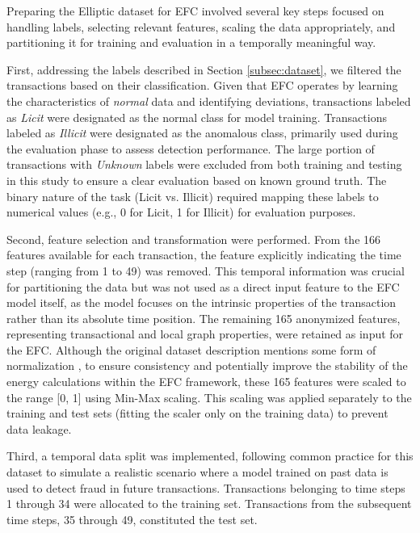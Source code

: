\documentclass[12pt]{article}
\begin{document}
Preparing the Elliptic dataset for EFC involved several key steps focused on handling labels, selecting relevant features,
scaling the data appropriately, and partitioning it for training and evaluation in a temporally meaningful way.

First, addressing the labels described in Section \ref{subsec:dataset}, we filtered the transactions based on their
classification. Given that EFC operates by learning the characteristics of \textit{normal} data and identifying deviations,
transactions labeled as \textit{Licit} were designated as the normal class for model training. Transactions labeled as \textit{Illicit}
were designated as the anomalous class, primarily used during the evaluation phase to assess detection performance. The
large portion of transactions with \textit{Unknown} labels were excluded from both training and testing in this study to ensure
a clear evaluation based on known ground truth. The binary nature of the task (Licit vs. Illicit) required mapping these
labels to numerical values (e.g., 0 for Licit, 1 for Illicit) for evaluation purposes.

Second, feature selection and transformation were performed. From the 166 features available for each transaction, the
feature explicitly indicating the time step (ranging from 1 to 49) was removed. This temporal information was crucial
for partitioning the data but was not used as a direct input feature to the EFC model itself, as the model focuses on the
intrinsic properties of the transaction rather than its absolute time position. The remaining 165 anonymized features,
representing transactional and local graph properties, were retained as input for the EFC. Although the original dataset
description mentions some form of normalization \cite{weber2019antimoneylaunderingbitcoinexperimenting}, to ensure consistency
and potentially improve the stability of the energy calculations within the EFC framework, these 165 features were scaled
to the range [0, 1] using Min-Max scaling. This scaling was applied separately to the training and test sets (fitting
the scaler only on the training data) to prevent data leakage.

Third, a temporal data split was implemented, following common practice for this dataset
\cite{weber2019antimoneylaunderingbitcoinexperimenting, lorenz2021machinelearningmethodsdetect} to simulate a realistic
scenario where a model trained on past data is used to detect fraud in future transactions. Transactions belonging to
time steps 1 through 34 were allocated to the training set. Transactions from the subsequent time steps, 35 through 49,
constituted the test set.
\end{document}

